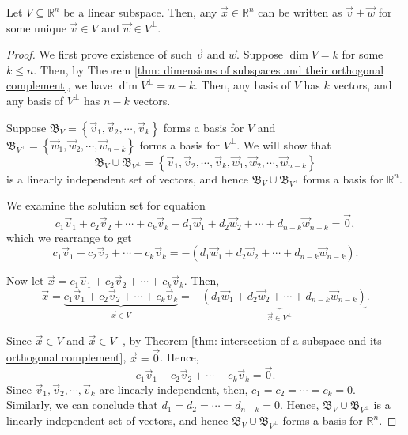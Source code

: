 \documentclass[]{book}
\newcommand{\bas}[1]{\ensuremath{\mathfrak{#1}}}
\newcommand{\R}{\ensuremath{\mathbb{R}}}
\begin{document}
\begin{theorem}[Representing $\R^n$ using $V$ and $V^{\perp}$]
    \label{thm: representing R^n using V and V^perp}
    Let $V \subseteq \R^n$ be a linear subspace. Then, any $\vec{x} \in \R^n$ can be written as $\vec{v} + \vec{w}$ for some unique $\vec{v} \in V$ and $\vec{w} \in V^{\perp}$. 
\begin{proof}
    We first prove existence of such $\vec{v}$ and $\vec{w}$. Suppose $\dim{V} = k$ for some $k \leq n$. Then, by Theorem \ref{thm: dimensions of subspaces and their orthogonal complement}, we have $\dim{V^{\perp}} = n-k$. Then, any basis of $V$ has $k$ vectors, and any basis of $V^{\perp}$ has $n-k$ vectors. 
    
    Suppose $\bas{B}_V = \left\{\vec{v}_1,\vec{v}_2,\cdots,\vec{v}_k\right\}$ forms a basis for $V$ and $\bas{B}_{V^{\perp}} = \left\{\vec{w}_1,\vec{w}_2,\cdots,\vec{w}_{n-k}\right\}$ forms a basis for $V^{\perp}$. We will show that \[\bas{B}_V \cup \bas{B}_{V^{\perp}} = \left\{\vec{v}_1,\vec{v}_2,\cdots,\vec{v}_k, \vec{w}_1,\vec{w}_2,\cdots,\vec{w}_{n-k}\right\}\] is a linearly independent set of vectors, and hence $\bas{B}_V \cup \bas{B}_{V^{\perp}}$ forms a basis for $\R^n$. 
    
    We examine the solution set for equation 
    \[c_1\vec{v}_1 + c_2\vec{v}_2 + \cdots + c_k\vec{v}_k + d_1\vec{w}_1 + d_2\vec{w}_2 + \cdots + d_{n-k}\vec{w}_{n-k} = \vec{0},\]
    which we rearrange to get
    \[c_1\vec{v}_1 + c_2\vec{v}_2 + \cdots + c_k\vec{v}_k = -\left(d_1\vec{w}_1 + d_2\vec{w}_2 + \cdots + d_{n-k}\vec{w}_{n-k}\right).\]
    
    Now let $\vec{x} = c_1\vec{v}_1 + c_2\vec{v}_2 + \cdots + c_k\vec{v}_k$. Then,
    \[\vec{x} = \underbrace{c_1\vec{v}_1 + c_2\vec{v}_2 + \cdots + c_k\vec{v}_k}_{\vec{x} \in V} = \underbrace{-\left(d_1\vec{w}_1 + d_2\vec{w}_2 + \cdots + d_{n-k}\vec{w}_{n-k}\right)}_{\vec{x} \in V^{\perp}}.\]
    
    Since $\vec{x} \in V$ and $\vec{x} \in V^{\perp}$, by Theorem \ref{thm: intersection of a subspace and its orthogonal complement}, $\vec{x} = \vec{0}$. Hence, 
    \[c_1\vec{v}_1 + c_2\vec{v}_2 + \cdots + c_k\vec{v}_k = \vec{0}.\] Since $\vec{v}_1,\vec{v}_2,\cdots,\vec{v}_k$ are linearly independent, then, $c_1 = c_2 = \cdots = c_k = 0$. Similarly, we can conclude that $d_1 = d_2 = \cdots = d_{n-k} = 0$. Hence, $\bas{B}_{V} \cup \bas{B}_{V^{\perp}}$ is a linearly independent set of vectors, and hence $\bas{B}_{V} \cup \bas{B}_{V^{\perp}}$ forms a basis for $\R^n$. 
    

\end{proof}
\end{theorem}
\end{document}
